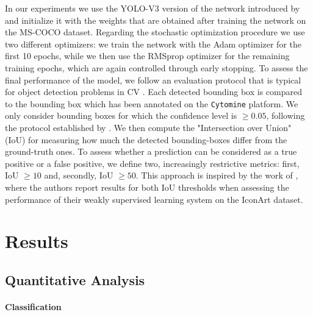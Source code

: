 In our experiments we use the YOLO-V3 version of the network introduced by \citet{redmon2018yolov3} and initialize it with the weights that are obtained after training the network on the MS-COCO dataset. Regarding the stochastic optimization procedure we use two different optimizers: we train the network with the Adam optimizer for the first 10 epochs, while we then use the RMSprop optimizer for the remaining training epochs, which are again controlled through early stopping. To assess the final performance of the model, we follow an evaluation protocol that is typical for object detection problems in CV \cite{lin2014microsoft}. Each detected bounding box is compared to the bounding box which has been annotated on the \texttt{Cytomine} platform. We only consider bounding boxes for which the confidence level is $\geq 0.05$, following the protocol established by \citet{everingham2010pascal}. We then compute the "Intersection over Union" (IoU) for measuring how much the detected bounding-boxes differ from the ground-truth ones. To assess whether a prediction can be considered as a true positive or a false positive, we define two, increasingly restrictive metrics: first, IoU $\geq10$ and, secondly, IoU $\geq50$. This approach is inspired by the work of \citet{gonthier2018weakly}, where the authors report results for both IoU thresholds when assessing the performance of their weakly supervised learning system on the IconArt dataset.

\section{Results}
\label{sec:results}

\subsection{Quantitative Analysis}
\label{sec:quantitative_analysis}
\paragraph{Classification}

